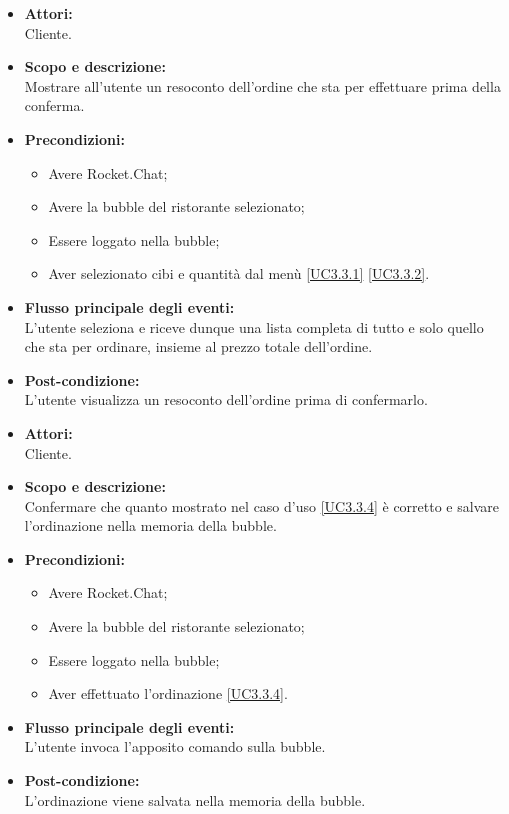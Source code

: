
\begin{itemize}
	\item \textbf{Attori:}
	\\Cliente.
	\item \textbf{Scopo e descrizione:} 
	\\Mostrare all'utente un resoconto dell'ordine che sta per effettuare prima della conferma.
	\item \textbf{Precondizioni:}
	\begin{itemize}
		\item Avere Rocket.Chat;
		\item Avere la bubble del ristorante selezionato;
		\item Essere loggato nella bubble;
		\item Aver selezionato cibi e quantità dal menù \ref{UC3.3.1} \ref{UC3.3.2}.
	\end{itemize}
	\item \textbf{Flusso principale degli eventi:}
	\\L'utente seleziona  e riceve dunque una lista completa di tutto e solo quello che sta per ordinare, insieme al prezzo totale dell'ordine.
	\item \textbf{Post-condizione:}
	\\L'utente visualizza un resoconto dell'ordine prima di confermarlo.
\end{itemize}


\begin{itemize}
	\item \textbf{Attori:}
	\\Cliente.
	\item \textbf{Scopo e descrizione:} 
	\\Confermare che quanto mostrato nel caso d'uso \ref{UC3.3.4} è corretto e salvare l'ordinazione nella memoria della bubble.
	\item \textbf{Precondizioni:}
	\begin{itemize}
		\item Avere Rocket.Chat;
		\item Avere la bubble del ristorante selezionato;
		\item Essere loggato nella bubble;
		\item Aver effettuato l'ordinazione \ref{UC3.3.4}.
	\end{itemize}
	\item \textbf{Flusso principale degli eventi:}
	\\L'utente invoca l'apposito comando sulla bubble.
	\item \textbf{Post-condizione:}
	\\L'ordinazione viene salvata nella memoria della bubble.
\end{itemize}

